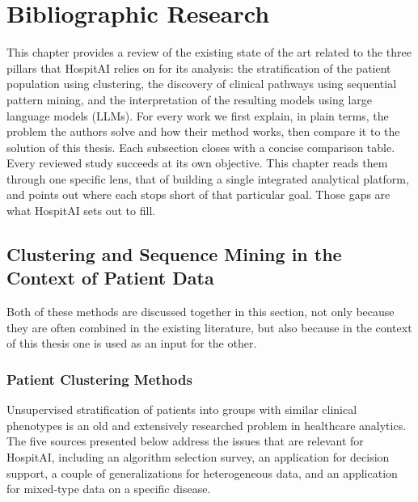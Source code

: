 \chapter{Bibliographic Research}\label{ch:research}

\pagestyle{fancy}

This chapter provides a review of the existing state of the art related to the three pillars that HospitAI relies on for its analysis: the stratification of the patient population using clustering, the discovery of clinical pathways using sequential pattern mining, and the interpretation of the resulting models using large language models (LLMs).
For every work we first explain, in plain terms, the problem the authors solve and how their method works, then compare it to the solution of this thesis. Each subsection closes with a concise comparison table.
Every reviewed study succeeds at its own objective. This chapter reads them through one specific lens, that of building a single integrated analytical platform, and points out where each stops short of that particular goal. Those gaps are what HospitAI sets out to fill.

\section{Clustering and Sequence Mining in the Context of Patient Data}\label{sec:rw_clustering_seq}

Both of these methods are discussed together in this section, not only because they are often combined in the existing literature, but also because in the context of this thesis one is used as an input for the other.

\subsection{Patient Clustering Methods}\label{sec:rw_clustering}

Unsupervised stratification of patients into groups with similar clinical phenotypes is an old and extensively researched problem in healthcare analytics.
The five sources presented below address the issues that are relevant for HospitAI, including an algorithm selection survey, an application for decision support, a couple of generalizations for heterogeneous data, and an application for mixed-type data on a specific disease.


